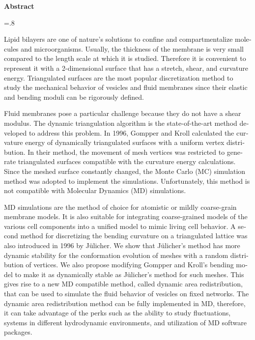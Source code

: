 


\pagestyle{empty}

\begin{latin}

\begin{center}
\textbf{Abstract}
\end{center}
\baselineskip=.8\baselineskip

Lipid bilayers are one of nature’s solutions to confine and compartmentalize molecules and microorganisms.  Usually, the thickness of the membrane is very small compared to the length scale at which it is studied. Therefore it is convenient to represent it with a 2-dimensional surface that has a stretch, shear, and curvature energy. Triangulated surfaces are the most popular discretization method to study the mechanical behavior of vesicles and fluid membranes since their elastic and bending moduli can be rigorously defined. 

Fluid membranes pose a particular challenge because they do not have a shear modulus. The dynamic triangulation algorithm is the state-of-the-art method developed to address this problem. In 1996, Gompper and Kroll calculated the curvature energy of dynamically triangulated surfaces with a uniform vertex distribution. In their method, the movement of mesh vertices was restricted to generate triangulated surfaces compatible with the curvature energy calculations. Since the meshed surface constantly changed, the Monte Carlo (MC) simulation method was adopted to implement the simulations. Unfortunately, this method is not compatible with Molecular Dynamics (MD) simulations.

MD  simulations are the method of choice for atomistic or mildly coarse-grain membrane models. It is also suitable for integrating coarse-grained models of the various cell components into a unified model to mimic living cell behavior.  A second method for discretizing the bending curvature on a triangulated lattice was also introduced in 1996 by J\"ulicher. We show that  J\"ulicher's method has more dynamic stability for the conformation evolution of meshes with a random distribution of vertices. We also propose modifying  Gompper and Kroll's bending model to make it as dynamically stable as J\"ulicher's method for such meshes. This gives rise to a new MD compatible method, called dynamic area redistribution, that can be used to simulate the fluid behavior of vesicles on fixed networks. The dynamic area redistribution method can be fully implemented in MD, therefore, it can take advantage of the perks such as the ability to study fluctuations, systems in different hydrodynamic environments, and utilization of MD software packages.  


\end{latin}
